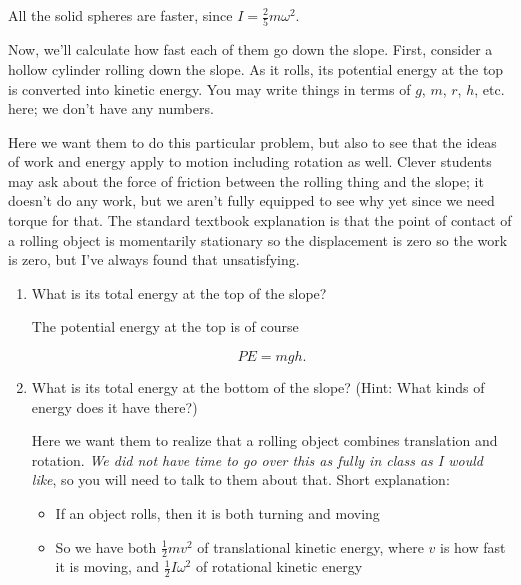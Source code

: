 \documentclass[12pt]{article}
\begin{document}
\begin{enumerate}
{{{All the solid spheres are faster, since $I = \frac{2}{5} m \omega ^2$.

}

{\color{blue}
	
}


\vspace{0.4in}

Now, we'll calculate how fast each of them go down the slope. First, consider a hollow cylinder rolling down the slope. As it rolls, its potential energy at the top is converted into kinetic energy. You may write things in terms of $g$, $m$, $r$, $h$, etc. here; we don't have any numbers.



{\color{red}
Here we want them to do this particular problem, but also to see that the ideas of work and energy apply to motion including rotation as well. Clever students may ask about the force of friction between the rolling thing and the slope; it doesn't do any work, but we aren't fully equipped to see why yet since we need torque for that. The standard textbook explanation is that the point of contact of a rolling object is momentarily stationary so the displacement is zero so the work is zero, but I've always found that unsatisfying.
}



\begin{enumerate}
	\item What is its total energy at the top of the slope?
\vspace{0.7in}

{\color{blue}
	The potential energy at the top is of course
	
	$$PE = mgh.$$
}

    \item What is its total energy at the bottom of the slope? (Hint: What kinds of energy does it have there?)
    
    
    {\color{red}
    Here we want them to realize that a rolling object combines translation and rotation. {\it We did not have time to go over this as fully in class as I would like}, so you will need to talk to them about that. Short explanation:
    
    \begin{itemize}
    \item If an object rolls, then it is both turning and moving
    \item So we have both $\frac{1}{2}mv^2$ of translational kinetic energy, where $v$ is how fast it is moving, and $\frac{1}{2}I\omega^2$ of rotational kinetic energy
    \end{itemize}
    }
    {\color{blue}
    
}
\end{enumerate}}}
\end{enumerate}
\end{document}
